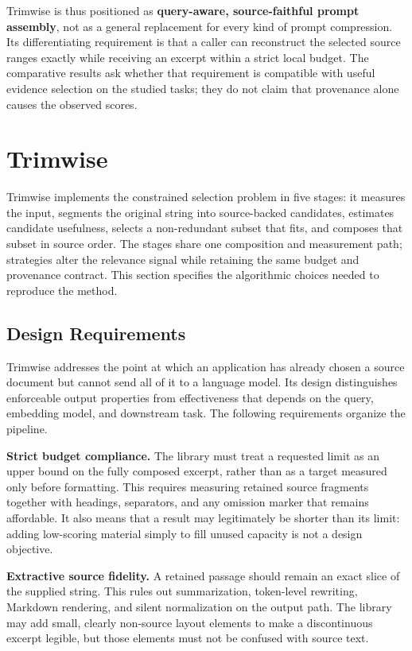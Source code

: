 \documentclass[
]{article}
\begin{document}
Trimwise is thus positioned as \textbf{query-aware, source-faithful
prompt assembly}, not as a general replacement for every kind of prompt
compression. Its differentiating requirement is that a caller can
reconstruct the selected source ranges exactly while receiving an
excerpt within a strict local budget. The comparative results ask
whether that requirement is compatible with useful evidence selection on
the studied tasks; they do not claim that provenance alone causes the
observed scores.

\section{Trimwise}\label{trimwise}

Trimwise implements the constrained selection problem in five stages: it
measures the input, segments the original string into source-backed
candidates, estimates candidate usefulness, selects a non-redundant
subset that fits, and composes that subset in source order. The stages
share one composition and measurement path; strategies alter the
relevance signal while retaining the same budget and provenance
contract. This section specifies the algorithmic choices needed to
reproduce the method.

\subsection{Design Requirements}\label{design-goals}

Trimwise addresses the point at which an application has already chosen
a source document but cannot send all of it to a language model. Its
design distinguishes enforceable output properties from effectiveness
that depends on the query, embedding model, and downstream task. The
following requirements organize the pipeline.

\textbf{Strict budget compliance.} The library must treat a requested
limit as an upper bound on the fully composed excerpt, rather than as a
target measured only before formatting. This requires measuring retained
source fragments together with headings, separators, and any omission
marker that remains affordable. It also means that a result may
legitimately be shorter than its limit: adding low-scoring material
simply to fill unused capacity is not a design objective.

\textbf{Extractive source fidelity.} A retained passage should remain an
exact slice of the supplied string. This rules out summarization,
token-level rewriting, Markdown rendering, and silent normalization on
the output path. The library may add small, clearly non-source layout
elements to make a discontinuous excerpt legible, but those elements
must not be confused with source text.
\end{document}
